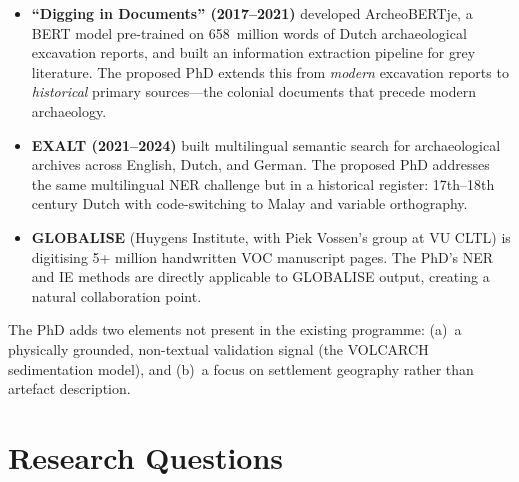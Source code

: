 \documentclass[11pt,a4paper]{article}
\begin{document}
\begin{itemize}[nosep]
  \item \textbf{``Digging in Documents'' (2017--2021)} developed ArcheoBERTje, a BERT model pre-trained on 658~million words of Dutch archaeological excavation reports, and built an information extraction pipeline for grey literature. The proposed PhD extends this from \emph{modern} excavation reports to \emph{historical} primary sources---the colonial documents that precede modern archaeology.
  \item \textbf{EXALT (2021--2024)} built multilingual semantic search for archaeological archives across English, Dutch, and German. The proposed PhD addresses the same multilingual NER challenge but in a historical register: 17th--18th century Dutch with code-switching to Malay and variable orthography.
  \item \textbf{GLOBALISE} (Huygens Institute, with Piek Vossen's group at VU CLTL) is digitising 5+ million handwritten VOC manuscript pages. The PhD's NER and IE methods are directly applicable to GLOBALISE output, creating a natural collaboration point.
\end{itemize}

The PhD adds two elements not present in the existing programme: (a)~a physically grounded, non-textual validation signal (the VOLCARCH sedimentation model), and (b)~a focus on settlement geography rather than artefact description.

\section{Research Questions}
\end{document}
